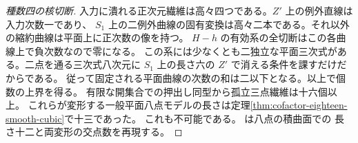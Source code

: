\begin{proof}[種数四の核切断]
入力に潰れる正次元繊維は高々四つである。$Z'$ 上の例外直線は入力次数一であり、
$S_1$ 上の二例外曲線の固有変換は高々二本である。それ以外の縮約曲線は平面上に正次数の像を持つ。
$H-h$ の有効系の全切断はこの各曲線上で負次数なので零になる。
この系には少なくとも二独立な平面三次式がある。二点を通る三次式八次元に
$S_1$ 上の長さ六の $Z'$ で消える条件を課すだけだからである。
従って固定される平面曲線の次数の和は二以下となる。以上で個数の上界を得る。
有限な開集合での押出し同型から孤立三点繊維は十六個以上。
これらが変形する一般平面八点モデルの長さは定理\ref{thm:cofactor-eighteen-smooth-cubic}で十三であった。
これも不可能である。 は八点の積曲面での
長さ十二と両変形の交点数を再現する。
\end{proof}
